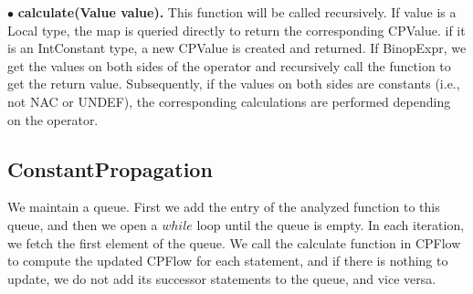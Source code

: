 \documentclass[conference]{IEEEtran}
\begin{document}
\noindent $\bullet$ \textbf{calculate(Value value). } This function will be called recursively. If value is a Local type, the map is queried directly to return the corresponding CPValue. if it is an IntConstant type, a new CPValue is created and returned. If BinopExpr, we get the values on both sides of the operator and recursively call the function to get the return value. Subsequently, if the values on both sides are constants (i.e., not NAC or UNDEF), the corresponding calculations are performed depending on the operator.


\subsection{ConstantPropagation}
We maintain a queue. First we add the entry of the analyzed function to this queue, and then we open a $while$ loop until the queue is empty. In each iteration, we fetch the first element of the queue. We call the calculate function in CPFlow to compute the updated CPFlow for each statement, and if there is nothing to update, we do not add its successor statements to the queue, and vice versa.
\end{document}
